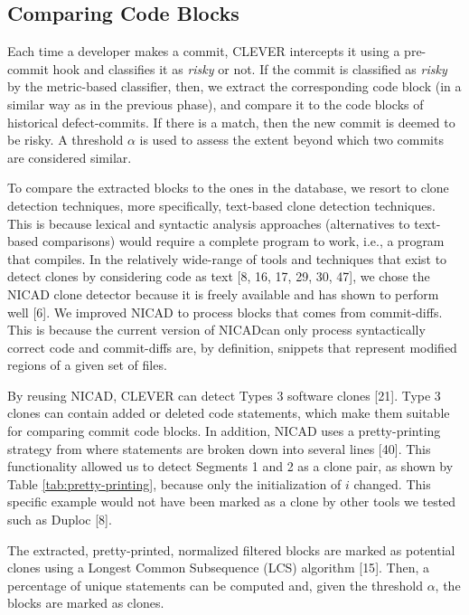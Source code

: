 \documentclass[sigconf]{acmart}
\begin{document}
\subsection{Comparing Code Blocks}\label{sec:online}

Each time a developer makes a commit, CLEVER intercepts it using a
pre-commit hook and classifies it as \emph{risky} or not. If the commit
is classified as \emph{risky} by the metric-based classifier, then, we
extract the corresponding code block (in a similar way as in the
previous phase), and compare it to the code blocks of historical
defect-commits. If there is a match, then the new commit is deemed to be
risky. A threshold \(\alpha\) is used to assess the extent beyond which
two commits are considered similar.

To compare the extracted blocks to the ones in the database, we resort
to clone detection techniques, more specifically, text-based clone
detection techniques. This is because lexical and syntactic analysis
approaches (alternatives to text-based comparisons) would require a
complete program to work, i.e., a program that compiles. In the
relatively wide-range of tools and techniques that exist to detect
clones by considering code as text {[}8, 16, 17, 29, 30, 47{]}, we chose
the NICAD clone detector because it is freely available and has shown to
perform well {[}6{]}. We improved NICAD to process blocks that comes
from commit-diffs. This is because the current version of NICADcan only
process syntactically correct code and commit-diffs are, by definition,
snippets that represent modified regions of a given set of files.

By reusing NICAD, CLEVER can detect Types 3 software clones {[}21{]}.
Type 3 clones can contain added or deleted code statements, which make
them suitable for comparing commit code blocks. In addition, NICAD uses
a pretty-printing strategy from where statements are broken down into
several lines {[}40{]}. This functionality allowed us to detect Segments
1 and 2 as a clone pair, as shown by Table \ref{tab:pretty-printing},
because only the initialization of \(i\) changed. This specific example
would not have been marked as a clone by other tools we tested such as
Duploc {[}8{]}.



The extracted, pretty-printed, normalized filtered blocks are marked as
potential clones using a Longest Common Subsequence (LCS) algorithm
{[}15{]}. Then, a percentage of unique statements can be computed and,
given the threshold \(\alpha\), the blocks are marked as clones.
\end{document}
